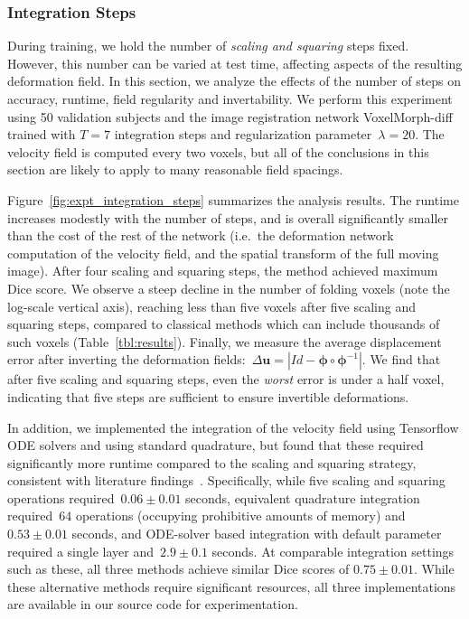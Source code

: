 \documentclass{article}
\newcommand{\bphi}{\boldsymbol{\phi}}
\newcommand{\bu}{\boldsymbol{u}}
\newcommand{\citep}{\cite}
\begin{document}
\subsubsection{Integration Steps}


	
	During training, we hold the number of \textit{scaling and squaring} steps fixed. However, this number can be varied at test time, affecting aspects of the resulting deformation field. In this section, we analyze the effects of the number of steps on accuracy, runtime, field regularity and invertability. We perform this experiment using 50 validation subjects and the image registration network VoxelMorph-diff trained with $T=7$ integration steps and regularization parameter~$\lambda=20$. The velocity field is computed every two voxels, but all of the conclusions in this section are likely to apply to many reasonable field spacings.
	
	Figure~\ref{fig:expt_integration_steps} summarizes the analysis results. The runtime increases modestly with the number of steps, and is overall significantly smaller than the cost of the rest of the network (i.e.\ the deformation network computation of the velocity field, and the spatial transform of the full moving image). After four scaling and squaring steps, the method achieved maximum Dice score. We observe a steep decline in the number of folding voxels (note the log-scale vertical axis), reaching less than five voxels after five scaling and squaring steps, compared to classical methods which can include thousands of such voxels (Table~\ref{tbl:results}). Finally, we measure the average displacement error after inverting the deformation fields:~$\Delta \bu = |Id - \bphi \circ \bphi^{-1}|$. We find that after five scaling and squaring steps, even the \textit{worst} error is under a half voxel, indicating that five steps are sufficient to ensure invertible deformations.
	
{\color{blue} In addition, we implemented the integration of the velocity field using Tensorflow ODE solvers and using standard quadrature,	but found that these required significantly more runtime
	compared to the scaling and squaring strategy, consistent with 
	literature findings~\citep{arsigny2006,ashburner2007,modat2014global}.}  Specifically, while five scaling and squaring operations required~$0.06\pm0.01$ seconds, equivalent quadrature integration required~$64$ operations (occupying prohibitive amounts of memory) and~$0.53\pm0.01$ seconds, and ODE-solver based integration with default parameter required a single layer and~$2.9 \pm 0.1$ seconds. At comparable integration settings such as these, all three methods achieve similar Dice scores of $0.75 \pm 0.01$. While these alternative methods require significant resources, all three implementations are available in our source code for experimentation.
	
\end{document}
